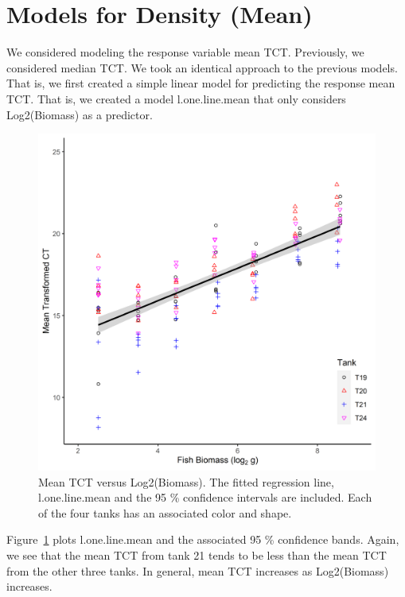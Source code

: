 \section{Models for Density (Mean)}

We considered modeling the response variable mean TCT. Previously, we considered median TCT. We took an identical approach to the previous models. That is, we first created a simple linear model for predicting the response mean TCT. That is, we created a model l.one.line.mean that only considers Log2(Biomass) as a predictor.

\vspace{12pt}



\begin{figure}[H]
\includegraphics{Chapter3Images/ggplotnew3.png}
\caption{ Mean TCT versus Log2(Biomass). The fitted regression line, l.one.line.mean and the 95 \% confidence intervals are included. Each of the four tanks has an associated color and shape.}
\label{fig:medct3}
\end{figure}

Figure~\ref{fig:medct3} plots l.one.line.mean and the associated 95 \% confidence bands.  Again, we see that the mean TCT from tank 21 tends to be less than the mean TCT from the other three tanks. In general, mean TCT increases as Log2(Biomass) increases.

